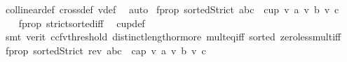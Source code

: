 \begin{isabellebody}
\ collinear{}{\isacharunderscore}{\kern0pt}def\ cross{}{\isacharunderscore}{\kern0pt}def\ v{}{\isacharunderscore}{\kern0pt}def\ \isamarkupfalse%
\ auto%
\endisatagproof
{\isafoldproof}%
%
\isadelimproof
\isanewline
%
\endisadelimproof
{}\isamarkupfalse%
\ f{\isacharunderscore}{\kern0pt}prop{}{\isacharcolon}{\kern0pt}\ {\isachardoublequoteopen}sortedStrict\ {\isacharbrackleft}{\kern0pt}a{\isacharcomma}{\kern0pt}b{\isacharcomma}{\kern0pt}c{\isacharbrackright}{\kern0pt}\ {\isasymlongrightarrow}\ cup{}\ {\isacharparenleft}{\kern0pt}v{}\ a{\isacharparenright}{\kern0pt}\ {\isacharparenleft}{\kern0pt}v{}\ b{\isacharparenright}{\kern0pt}\ {\isacharparenleft}{\kern0pt}v{}\ c{\isacharparenright}{\kern0pt}{\isachardoublequoteclose}\ \isanewline
%
\isadelimproof
\ \ %
\endisadelimproof
%
\isatagproof
{}\isamarkupfalse%
\ f{\isacharunderscore}{\kern0pt}prop{}\ strict{\isacharunderscore}{\kern0pt}sorted{\isacharunderscore}{\kern0pt}iff\ \isamarkupfalse%
\ cup{}{\isacharunderscore}{\kern0pt}def\isanewline
\ \ \isamarkupfalse%
\ {\isacharparenleft}{\kern0pt}smt\ {\isacharparenleft}{\kern0pt}verit{\isacharcomma}{\kern0pt}\ ccfv{\isacharunderscore}{\kern0pt}threshold{\isacharparenright}{\kern0pt}\ distinct{\isacharunderscore}{\kern0pt}length{\isacharunderscore}{\kern0pt}{}{\isacharunderscore}{\kern0pt}or{\isacharunderscore}{\kern0pt}more\ mult{\isacharunderscore}{\kern0pt}eq{\isacharunderscore}{\kern0pt}{}{\isacharunderscore}{\kern0pt}iff\ sorted{}\ zero{\isacharunderscore}{\kern0pt}less{\isacharunderscore}{\kern0pt}mult{\isacharunderscore}{\kern0pt}iff{\isacharparenright}{\kern0pt}%
\endisatagproof
{\isafoldproof}%
%
\isadelimproof
\isanewline
%
\endisadelimproof
{}\isamarkupfalse%
\ f{\isacharunderscore}{\kern0pt}prop{}{\isacharcolon}{\kern0pt}\ {\isachardoublequoteopen}sortedStrict\ {\isacharparenleft}{\kern0pt}rev\ {\isacharbrackleft}{\kern0pt}a{\isacharcomma}{\kern0pt}b{\isacharcomma}{\kern0pt}c{\isacharbrackright}{\kern0pt}{\isacharparenright}{\kern0pt}\ {\isasymlongrightarrow}\ cap{}\ {\isacharparenleft}{\kern0pt}v{}\ a{\isacharparenright}{\kern0pt}\ {\isacharparenleft}{\kern0pt}v{}\ b{\isacharparenright}{\kern0pt}\ {\isacharparenleft}{\kern0pt}v{}\ c{\isacharparenright}{\kern0pt}{\isachardoublequoteclose}\isanewline
%
\isadelimproof
\ \ %

\end{isabellebody}
